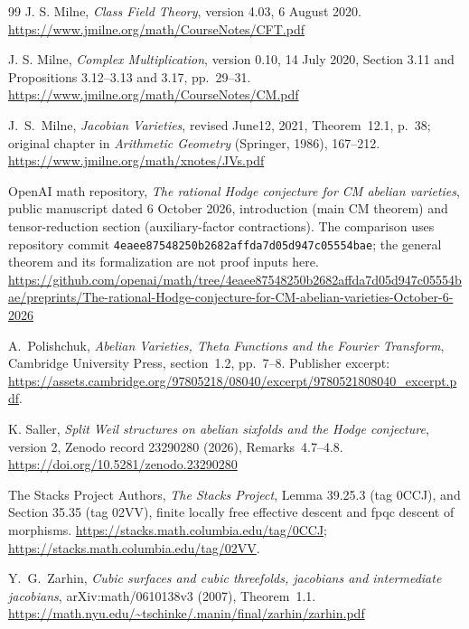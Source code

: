 \begin{thebibliography}{99}
J. S. Milne,
\emph{Class Field Theory}, version 4.03, 6 August 2020.
\url{https://www.jmilne.org/math/CourseNotes/CFT.pdf}

J. S. Milne,
\emph{Complex Multiplication}, version 0.10, 14 July 2020,
Section 3.11 and Propositions 3.12--3.13 and 3.17, pp.~29--31.
\url{https://www.jmilne.org/math/CourseNotes/CM.pdf}

J.~S.~Milne, \emph{Jacobian Varieties}, revised June12, 2021,
Theorem~12.1, p.~38; original chapter in \emph{Arithmetic Geometry}
(Springer, 1986), 167--212.
\url{https://www.jmilne.org/math/xnotes/JVs.pdf}

OpenAI math repository,
\emph{The rational Hodge conjecture for CM abelian varieties},
public manuscript dated 6 October 2026, introduction (main CM theorem)
and tensor-reduction section (auxiliary-factor contractions).
The comparison uses repository commit
\texttt{4eaee87548250b2682affda7d05d947c05554bae};
the general theorem and its formalization are not proof inputs here.
\url{https://github.com/openai/math/tree/4eaee87548250b2682affda7d05d947c05554bae/preprints/The-rational-Hodge-conjecture-for-CM-abelian-varieties-October-6-2026}

A.~Polishchuk, \emph{Abelian Varieties, Theta Functions and the Fourier
Transform}, Cambridge University Press, section~1.2, pp.~7--8.
Publisher excerpt: \url{https://assets.cambridge.org/97805218/08040/excerpt/9780521808040_excerpt.pdf}.

K. Saller,
\emph{Split Weil structures on abelian sixfolds and the Hodge conjecture},
version 2, Zenodo record 23290280 (2026), Remarks~4.7--4.8.
\url{https://doi.org/10.5281/zenodo.23290280}

The Stacks Project Authors,
\emph{The Stacks Project}, Lemma 39.25.3 (tag 0CCJ),
and Section 35.35 (tag 02VV), finite locally free effective descent
and fpqc descent of morphisms.
\url{https://stacks.math.columbia.edu/tag/0CCJ};
\url{https://stacks.math.columbia.edu/tag/02VV}.

Y.~G.~Zarhin, \emph{Cubic surfaces and cubic threefolds, jacobians
and intermediate jacobians}, arXiv:math/0610138v3 (2007), Theorem~1.1.
\url{https://math.nyu.edu/~tschinke/.manin/final/zarhin/zarhin.pdf}

\end{thebibliography}
